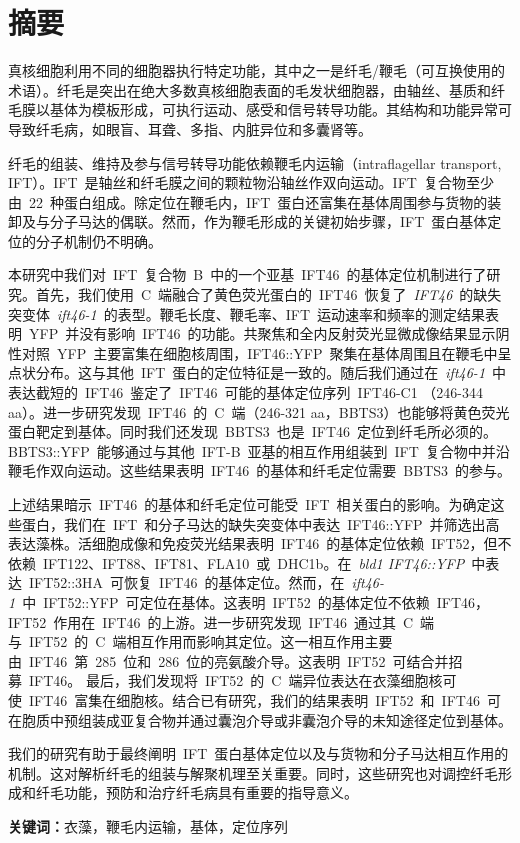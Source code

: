\chapter{摘要}
\renewcommand{\leftmark}{摘要}
真核细胞利用不同的细胞器执行特定功能，其中之一是纤毛/鞭毛（可互换使用的术语）。纤毛是突出在绝大多数真核细胞表面的毛发状细胞器，由轴丝、基质和纤毛膜以基体为模板形成，可执行运动、感受和信号转导功能。其结构和功能异常可导致纤毛病，如眼盲、耳聋、多指、内脏异位和多囊肾等。

纤毛的组装、维持及参与信号转导功能依赖鞭毛内运输（intraflagellar transport, IFT）。IFT\ 是轴丝和纤毛膜之间的颗粒物沿轴丝作双向运动。IFT\ 复合物至少由\ 22\ 种蛋白组成。除定位在鞭毛内，IFT\ 蛋白还富集在基体周围参与货物的装卸及与分子马达的偶联。然而，作为鞭毛形成的关键初始步骤，IFT\ 蛋白基体定位的分子机制仍不明确。

本研究中我们对\ IFT\ 复合物\ B\ 中的一个亚基\ IFT46\ 的基体定位机制进行了研究。首先，我们使用\ C\ 端融合了黄色荧光蛋白的\ IFT46\ 恢复了\ \textit{IFT46}\ 的缺失突变体\ \textit{ift46-1}\ 的表型。鞭毛长度、鞭毛率、IFT\ 运动速率和频率的测定结果表明\ YFP\ 并没有影响\ IFT46\ 的功能。共聚焦和全内反射荧光显微成像结果显示阴性对照\ YFP\ 主要富集在细胞核周围，IFT46::YFP\ 聚集在基体周围且在鞭毛中呈点状分布。这与其他\ IFT\ 蛋白的定位特征是一致的。随后我们通过在\ \textit{ift46-1}\ 中表达截短的\ IFT46\ 鉴定了\ IFT46\ 可能的基体定位序列\ IFT46-C1 （246-344 aa）。进一步研究发现\ IFT46\ 的\ C\ 端（246-321 aa，BBTS3）也能够将黄色荧光蛋白靶定到基体。同时我们还发现\ BBTS3\ 也是\ IFT46\ 定位到纤毛所必须的。BBTS3::YFP\ 能够通过与其他\ IFT-B\ 亚基的相互作用组装到\ IFT\ 复合物中并沿鞭毛作双向运动。这些结果表明\ IFT46\ 的基体和纤毛定位需要\ BBTS3\ 的参与。

上述结果暗示\ IFT46\ 的基体和纤毛定位可能受\ IFT\ 相关蛋白的影响。为确定这些蛋白，我们在\ IFT\ 和分子马达的缺失突变体中表达\ IFT46::YFP\ 并筛选出高表达藻株。活细胞成像和免疫荧光结果表明\ IFT46\ 的基体定位依赖\ IFT52，但不依赖\ IFT122、IFT88、IFT81、FLA10\ 或\ DHC1b。在\ \textit{bld1 IFT46::YFP}\ 中表达\ IFT52::3HA\ 可恢复\ IFT46\ 的基体定位。然而，在\ \textit{ift46-1}\ 中\ IFT52::YFP\ 可定位在基体。这表明\ IFT52\ 的基体定位不依赖\ IFT46，IFT52\ 作用在\ IFT46\ 的上游。进一步研究发现\ IFT46\ 通过其\ C\ 端与\ IFT52\ 的\ C\ 端相互作用而影响其定位。这一相互作用主要由\ IFT46\ 第\ 285\ 位和\ 286\ 位的亮氨酸介导。这表明\ IFT52\ 可结合并招募\ IFT46。 最后，我们发现将\ IFT52\ 的\ C\ 端异位表达在衣藻细胞核可使\ IFT46\ 富集在细胞核。结合已有研究，我们的结果表明\ IFT52\ 和\ IFT46\ 可在胞质中预组装成亚复合物并通过囊泡介导或非囊泡介导的未知途径定位到基体。

我们的研究有助于最终阐明\ IFT\ 蛋白基体定位以及与货物和分子马达相互作用的机制。这对解析纤毛的组装与解聚机理至关重要。同时，这些研究也对调控纤毛形成和纤毛功能，预防和治疗纤毛病具有重要的指导意义。

\vspace{10mm}

\noindent \textbf{关键词：}衣藻，鞭毛内运输，基体，定位序列









